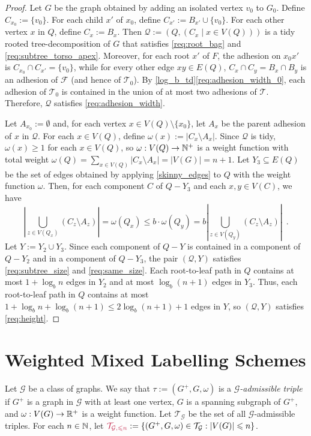 \documentclass{patmorin}
\makeatletter
\renewcommand{\ge}{\geqslant}
\renewcommand{\le}{\leqslant}
\newcommand{\defin}[1]{\emph{\textcolor{brightmaroon}{#1}}}
\def\mathcolor#1#{\@mathcolor{#1}}
\def\@mathcolor#1#2#3{%
  \protect\leavevmode
  \begingroup
    \color#1{#2}#3%
  \endgroup
}
\newcommand{\mathdefin}[1]{\mathcolor{brightmaroon}{#1}}
\newcommand{\calF}{\mathcal{F}}
\newcommand{\calG}{\mathcal{G}}
\newcommand{\calQ}{\mathcal{Q}}
\newcommand{\calT}{\mathcal{T}}
\makeatother
\begin{document}
\begin{proof}
  Let $G$ be the graph obtained by adding an isolated vertex $v_0$ to $G_0$.  Define $C_{x_0}:=\{v_0\}$. For each child $x'$ of $x_0$, define $C_{x'}:=B_{x'}\cup\{v_0\}$.  For each other vertex $x$ in $Q$, define $C_x:=B_x$.  Then $\calQ:=(Q,(C_x\mid x\in V(Q)))$ is a tidy rooted tree-decomposition of $G$ that satisfies \ref{req:root_bag} and \ref{req:subtree_torso_apex}. Moreover, for each root $x'$ of $F$, the adhesion on $x_0x'$ is $C_{x_0}\cap C_{x'}=\{v_0\}$, while for every other edge $xy\in E(Q)$, $C_x\cap C_y = B_x\cap B_y$ is an adhesion of $\calF$ (and hence of $\calT_0$). By \cref{log_b_td}\ref{req:adhesion_width_0}, each adhesion of $\calT_0$ is contained in the union of at most two adhesions of $\calT$. Therefore, $\calQ$ satisfies \ref{req:adhesion_width}.

  Let $A_{x_0}:=\emptyset$ and, for each vertex $x\in V(Q)\setminus\{x_0\}$, let $A_x$ be the parent adhesion of $x$ in $\calQ$.  For each $x\in V(Q)$, define $\omega(x):=|C_x\setminus A_x|$.  Since $\calQ$ is tidy, $\omega(x)\ge 1$ for each $x\in V(Q)$, so $\omega:V(Q)\to\mathbb{N}^+$ is a weight function with total weight $\omega(Q)=\sum_{x\in V(Q)}|C_x\setminus A_x|=|V(G)|=n+1$.  Let $Y_3\subseteq E(Q)$ be the set of edges obtained by applying \cref{skinny_edges} to $Q$ with the weight function $\omega$.  Then, for each component $C$ of $Q-Y_3$ and each $x,y\in V(C)$, we have   
  \[
      \textstyle \left|\bigcup_{z\in V(Q_x)}(C_z\setminus A_z)\right|=\omega(Q_x)\le b\cdot\omega(Q_y)=b\left|\bigcup_{z\in V(Q_y)}(C_z\setminus A_z)\right| \enspace .
  \]
  Let $Y:=Y_2\cup Y_3$.  Since each component of $Q-Y$ is contained in a component of $Q-Y_2$ and in a component of $Q-Y_3$, the pair $(\calQ,Y)$ satisfies \ref{req:subtree_size} and \ref{req:same_size}.  Each root-to-leaf path in $Q$ contains at most $1+\log_b n$ edges in $Y_2$ and at most $\log_b(n+1)$ edges in $Y_3$.  Thus, each root-to-leaf path in $Q$ contains at most $1 + \log_b n + \log_b(n+1) \le 2\log_b(n+1)+1$ edges in $Y$, so $(\calQ,Y)$ satisfies \ref{req:height}.
\end{proof}


\section{Weighted Mixed Labelling Schemes}
\label{weighted_mixed_section}
 
Let $\calG$ be a class of graphs. We say that $\tau:=(G^+,G,\omega)$ is a \defin{$\calG$-admissible triple} if $G^+$ is a graph in $\calG$ with at least one vertex, $G$ is a spanning subgraph of $G^+$, and $\omega:V(G)\to\mathbb{R}^+$ is a weight function.  Let \defin{$\calT_\calG$} be the set of all $\calG$-admissible triples. For each $n\in\mathbb{N}$, let $\mathdefin{\calT_{\calG,\le n}}:=\{(G^+,G,\omega)\in\calT_\calG:|V(G)|\le n\}$.
\end{document}
